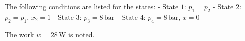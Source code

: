 The following conditions are listed for the states:  
- State \( 1 \): \( p_1 = p_2 \)  
- State \( 2 \): \( p_2 = p_1 \), \( x_2 = 1 \)  
- State \( 3 \): \( p_3 = 8 \, \text{bar} \)  
- State \( 4 \): \( p_4 = 8 \, \text{bar} \), \( x = 0 \)  

The work \( w = 28 \, \text{W} \) is noted.